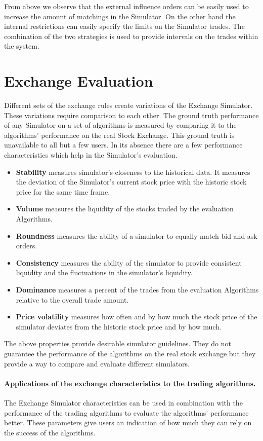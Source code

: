 \documentclass{article}
\begin{document}
From above we observe that the external influence orders can be easily used to increase the amount of matchings in the Simulator. On the other hand the internal restrictions can easily specify the limits on the Simulator trades. The combination of the two strategies is used to provide intervals on the trades within the system. 

\section{Exchange Evaluation}

Different sets of the exchange rules create variations of the Exchange Simulator. These variations require comparison to each other. The ground truth performance of any Simulator on a set of algorithms is measured by comparing it to the algorithms' performance on the real Stock Exchange. This ground truth is unavailable to all but a few users. In its absence there are a few performance characteristics which help in the Simulator's evaluation.

\begin{itemize}
    \item {\bf Stability} measures simulator's closeness to the historical data. It measures the deviation of the Simulator's current stock price with the historic stock price for the same time frame. 
    \item {\bf Volume} measures the liquidity of the stocks traded by the evaluation Algorithms. 
    \item {\bf Roundness} measures the ability of a simulator to equally match bid and ask orders. 
    \item {\bf Consistency} measures the ability of the simulator to provide consistent liquidity and the fluctuations in the simulator's liquidity. 
    \item {\bf Dominance} measures a percent of the trades from the evaluation Algorithms relative to the overall trade amount. 
    \item {\bf Price volatility} measures how often and by how much the stock price of the simulator deviates from the historic stock price and by how much.
\end{itemize}

The above properties provide desirable simulator guidelines. They do not guarantee the performance of the algorithms on the real stock exchange but they provide a way to compare and evaluate different simulators.

\paragraph{Applications of the exchange characteristics to the trading algorithms.} 
The Exchange Simulator characteristics can be used in combination with the performance of the trading algorithms to evaluate the algorithms' performance better. These parameters give users an indication of how much they can rely on the success of the algorithms.
\end{document}
